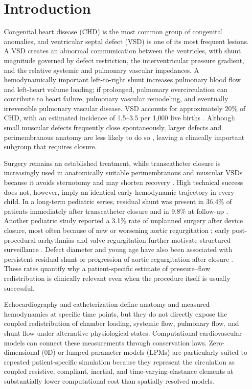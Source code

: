 \documentclass{article}
\begin{document}
\section{Introduction}

Congenital heart disease (CHD) is the most common group of congenital anomalies, and ventricular septal defect (VSD) is one of its most frequent lesions. A VSD creates an abnormal communication between the ventricles, with shunt magnitude governed by defect restriction, the interventricular pressure gradient, and the relative systemic and pulmonary vascular impedances. A hemodynamically important left-to-right shunt increases pulmonary blood flow and left-heart volume loading; if prolonged, pulmonary overcirculation can contribute to heart failure, pulmonary vascular remodeling, and eventually irreversible pulmonary vascular disease. VSD accounts for approximately 20\% of CHD, with an estimated incidence of 1.5--3.5 per 1,000 live births \cite{Haas_2024}. Although small muscular defects frequently close spontaneously, larger defects and perimembranous anatomy are less likely to do so \cite{Zhao_2019a}, leaving a clinically important subgroup that requires closure.

Surgery remains an established treatment, while transcatheter closure is increasingly used in anatomically suitable perimembranous and muscular VSDs because it avoids sternotomy and may shorten recovery \cite{Ali_Hassan_2019}. High technical success does not, however, imply an identical early hemodynamic trajectory in every child. In a long-term pediatric series, residual shunt was present in 36.4\% of patients immediately after transcatheter closure and in 9.8\% at follow-up \cite{Vuran2026}. Another pediatric study reported a 3.1\% rate of unplanned surgery after device closure, most often because of new or worsening aortic regurgitation \cite{Yang2021Surgery}; early post-procedural arrhythmias and valve regurgitation further motivate structured surveillance \cite{Kuswiyanto_et_al._2022}. Defect diameter and young age have also been associated with persistent residual shunt or progression of aortic regurgitation after closure \cite{Chin2024}. These rates quantify why a patient-specific estimate of pressure--flow redistribution is clinically relevant even when the procedure itself is usually successful.

Echocardiography and catheterization define anatomy and measured hemodynamics at specific time points, but they do not directly expose the coupled redistribution of chamber loading, systemic flow, pulmonary flow, and shunt flow under alternative physiological states. Computational cardiovascular models can connect these measurements through conservation laws. Zero-dimensional (0D) or lumped-parameter models (LPMs) are particularly suited to repeated patient-specific simulation because they represent the circulation as coupled resistive, compliant, inertial, and time-varying-elastance elements at substantially lower computational cost than spatially resolved models.
\end{document}
